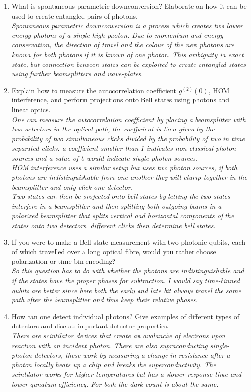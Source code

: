 \documentclass[a4paper]{scrartcl}
\newcommand{\qa}[2]{#1\\ \textit{#2}}
\begin{document}
\begin{enumerate}[label=(\alph*)]
  \item \qa{What is spontaneous parametric downconversion? Elaborate on how it can be used to create entangled pairs of photons.}{Spontaneous parametric downconversion is a process which creates two lower energy photons of a single high photon. Due to momentum and energy conservation, the direction of travel and the colour of the new photons are known for both photons if it is known of one photon. This ambiguity in exact state, but connection between states can be exploited to create entangled states using further beamsplitters and wave-plates.}
  \item \qa{Explain how to measure the autocorrelation coefficient $g^{(2)}(0)$, HOM interference, and perform projections onto Bell states using photons and linear optics.}{One can measure the autocorrelation coefficient by placing a beamsplitter with two detectors in the optical path, the coefficient is then given by the probability of two simultaneous clicks divided by the probability of two in time separated clicks. a coefficient smaller than 1 indicates non-classical photon sources and a value of 0 would indicate single photon sources.\\ HOM interference uses a similar setup but uses two photon sources, if both photons are indistinguishable from one another they will clump together in the beamsplitter and only click one detector.\\ Two states can then be projected onto bell states by letting the two states interfere in a beamsplitter and then splitting both outgoing beams in a polarized beamsplitter that splits vertical and horizontal components of the states onto two detectors, different clicks then determine bell states.}
  \item \qa{If you were to make a Bell-state measurement with two photonic qubits, each of which travelled over a long optical fibre, would you rather choose polarization or time-bin encoding?}{So this question has to do with whether the photons are indistinguishable and if the states have the proper phases for subtraction. I would say time-binned qubits are better since here both the early and late bit always travel the same path after the beamsplitter and thus keep their relative phases.}
  \item \qa{How can one detect individual photons? Give examples of different types of detectors and discuss important detector properties.}{There are scintilator devices that create an avalanche of electrons upon reaction with an incident photon. There are also supraconducting single-photon detectors, these work by measuring a change in resistance after a photon locally heats up a chip and breaks the superconductivity. The scintilator works for higher temperatures but has a slower response time and lower qunatum efficiency. For both the dark count is about the same. }
\end{enumerate}
\end{document}

